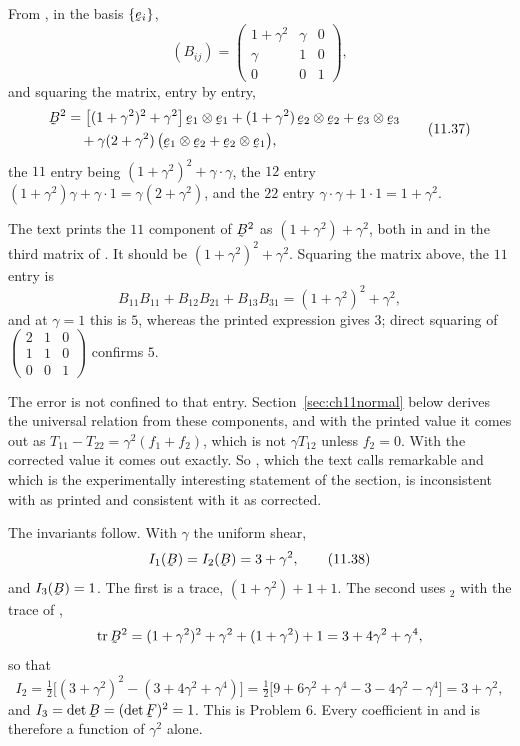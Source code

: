 From , in the basis $\{\be_{i}\}$,
\[
   (B_{ij})=\begin{pmatrix}1+\gamma^{2}&\gamma&0\\
   \gamma&1&0\\ 0&0&1\end{pmatrix},
\]
and squaring the matrix, entry by entry,
\begin{equation}
\begin{aligned}
   \bB^{2}&=\big[(1+\gamma^{2})^{2}+\gamma^{2}\big]\,
     \be_{1}\otimes\be_{1}
    +(1+\gamma^{2})\,\be_{2}\otimes\be_{2}+\be_{3}\otimes\be_{3}\\
   &\quad+\gamma(2+\gamma^{2})\,
     \big(\be_{1}\otimes\be_{2}+\be_{2}\otimes\be_{1}\big),
\end{aligned}
   \tag{11.37}\label{eq:11.37}
\end{equation}
the $11$ entry being $(1+\gamma^{2})^{2}+\gamma\cdot\gamma$, the $12$
entry $(1+\gamma^{2})\gamma+\gamma\cdot1=\gamma(2+\gamma^{2})$, and the
$22$ entry $\gamma\cdot\gamma+1\cdot1=1+\gamma^{2}$.

\begin{remark}\label{rem:ch11mis37}
The text prints the $11$ component of $\bB^{2}$ as
$(1+\gamma^{2})+\gamma^{2}$, both in  and in the third matrix
of . It should be $(1+\gamma^{2})^{2}+\gamma^{2}$. Squaring
the matrix above, the $11$ entry is
\[
   B_{11}B_{11}+B_{12}B_{21}+B_{13}B_{31}
   =(1+\gamma^{2})^{2}+\gamma^{2} ,
\]
and at $\gamma=1$ this is $5$, whereas the printed expression gives $3$;
direct squaring of $\left(\begin{smallmatrix}2&1&0\\1&1&0\\
0&0&1\end{smallmatrix}\right)$ confirms $5$.

The error is not confined to that entry. Section~\ref{sec:ch11normal}
below derives the universal relation  from these components,
and with the printed value it comes out as
$T_{11}-T_{22}=\gamma^{2}(f_{1}+f_{2})$, which is not $\gamma T_{12}$
unless $f_{2}=0$. With the corrected value it comes out exactly. So
, which the text calls remarkable and which is the
experimentally interesting statement of the section, is inconsistent
with  as printed and consistent with it as corrected.
\end{remark}

The invariants follow. With $\gamma$ the uniform shear,
\begin{equation}
   I_{1}(\bB)=I_{2}(\bB)=3+\gamma^{2},
   \tag{11.38}\label{eq:11.38}
\end{equation}
and $I_{3}(\bB)=1$. The first is a trace, $(1+\gamma^{2})+1+1$. The
second uses $_{2}$ with the trace of ,
\[
   \tr\bB^{2}=(1+\gamma^{2})^{2}+\gamma^{2}+(1+\gamma^{2})+1
   =3+4\gamma^{2}+\gamma^{4},
\]
so that
\[
   I_{2}=\tfrac12\big[(3+\gamma^{2})^{2}-(3+4\gamma^{2}+\gamma^{4})\big]
   =\tfrac12\big[9+6\gamma^{2}+\gamma^{4}-3-4\gamma^{2}-\gamma^{4}\big]
   =3+\gamma^{2},
\]
and $I_{3}=\det\bB=(\det\bF)^{2}=1$. This is Problem 6. Every
coefficient in  and  is therefore a function of
$\gamma^{2}$ alone.

